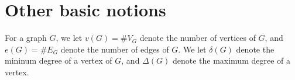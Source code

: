 \section{Other basic notions} \label{other basic notions section}

For a graph $G$, we let $v(G) = \#V_G$ denote the number of vertices of
$G$, and $e(G) = \#E_G$ denote the number of edges of $G$. We let
$\delta(G)$ denote the mininum degree of a vertex of $G$, and $\Delta(G)$
denote the maximum degree of a vertex.

